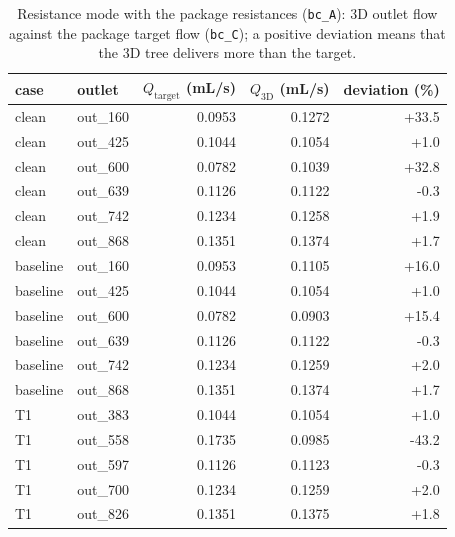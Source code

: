 \documentclass[11pt]{article}
\begin{document}
\begin{table}[H]
\centering
\caption{Resistance mode with the package resistances (\texttt{bc\_A}): 3D outlet flow against the package target flow (\texttt{bc\_C}); a positive deviation means that the 3D tree delivers more than the target.}
\label{tab:m1-flows}
\small
\begin{tabular}{llrrr}
\toprule
case & outlet & $Q_\text{target}$ (mL/s) & $Q_\text{3D}$ (mL/s) & deviation (\%) \\
\midrule
clean & out\_160 & 0.0953 & 0.1272 & +33.5 \\
clean & out\_425 & 0.1044 & 0.1054 & +1.0 \\
clean & out\_600 & 0.0782 & 0.1039 & +32.8 \\
clean & out\_639 & 0.1126 & 0.1122 & -0.3 \\
clean & out\_742 & 0.1234 & 0.1258 & +1.9 \\
clean & out\_868 & 0.1351 & 0.1374 & +1.7 \\
baseline & out\_160 & 0.0953 & 0.1105 & +16.0 \\
baseline & out\_425 & 0.1044 & 0.1054 & +1.0 \\
baseline & out\_600 & 0.0782 & 0.0903 & +15.4 \\
baseline & out\_639 & 0.1126 & 0.1122 & -0.3 \\
baseline & out\_742 & 0.1234 & 0.1259 & +2.0 \\
baseline & out\_868 & 0.1351 & 0.1374 & +1.7 \\
T1 & out\_383 & 0.1044 & 0.1054 & +1.0 \\
T1 & out\_558 & 0.1735 & 0.0985 & -43.2 \\
T1 & out\_597 & 0.1126 & 0.1123 & -0.3 \\
T1 & out\_700 & 0.1234 & 0.1259 & +2.0 \\
T1 & out\_826 & 0.1351 & 0.1375 & +1.8 \\
\bottomrule
\end{tabular}
\end{table}
\end{document}
